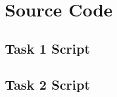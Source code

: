 \section{Source Code}

\subsection{Task 1 Script}



\pagebreak

\subsection{Task 2 Script}



\pagebreak
